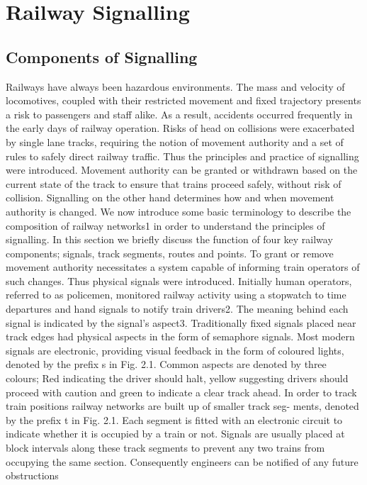 \documentclass[runningheads]{llncs}
\begin{document}
\section{Railway Signalling}
\subsection{Components of Signalling}
Railways have always been hazardous environments. The mass and velocity of locomotives,
coupled with their restricted movement and fixed trajectory presents a risk to passengers
and staff alike. As a result, accidents occurred frequently in the early days of railway
operation. Risks of head on collisions were exacerbated by single lane tracks, requiring
the notion of movement authority and a set of rules to safely direct railway traffic. Thus
the principles and practice of signalling were introduced. Movement authority can be
granted or withdrawn based on the current state of the track to ensure that trains proceed
safely, without risk of collision. Signalling on the other hand determines how and when
movement authority is changed. We now introduce some basic terminology to describe
the composition of railway networks1 in order to understand the principles of signalling.
In this section we briefly discuss the function of four key railway components; signals,
track segments, routes and points.
To grant or remove movement authority necessitates a system capable of informing
train operators of such changes. Thus physical signals were introduced. Initially human
operators, referred to as policemen, monitored railway activity using a stopwatch to time
departures and hand signals to notify train drivers2. The meaning behind each signal is indicated by the signal’s aspect3. Traditionally fixed signals placed near track edges had
physical aspects in the form of semaphore signals. Most modern signals are electronic,
providing visual feedback in the form of coloured lights, denoted by the prefix s in Fig.
2.1. Common aspects are denoted by three colours; Red indicating the driver should halt,
yellow suggesting drivers should proceed with caution and green to indicate a clear track
ahead.
In order to track train positions railway networks are built up of smaller track seg-
ments, denoted by the prefix t in Fig. 2.1. Each segment is fitted with an electronic
circuit to indicate whether it is occupied by a train or not. Signals are usually placed
at block intervals along these track segments to prevent any two trains from occupying
the same section. Consequently engineers can be notified of any future obstructions
\end{document}
